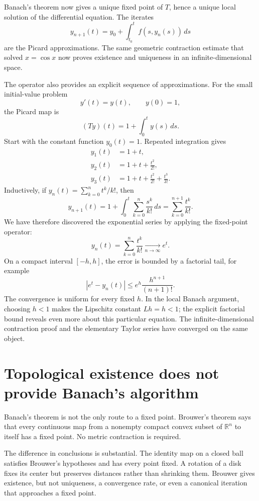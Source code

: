 Banach's theorem now gives a unique fixed point of \(T\), hence a unique local solution of the differential equation.  The iterates
\[
  y_{n+1}(t)
  =y_0+\int_{t_0}^{t}f(s,y_n(s))\,ds
\]
are the Picard approximations.  The same geometric contraction estimate that solved \(x=\cos x\) now proves existence and uniqueness in an infinite-dimensional space.

The operator also provides an explicit sequence of approximations. For the small initial-value problem
\[
 y'(t)=y(t),\qquad y(0)=1,
\]
the Picard map is
\[
 (Ty)(t)=1+\int_0^t y(s)\,ds.
\]
Start with the constant function $y_0(t)=1$. Repeated integration gives
\[
\begin{aligned}
 y_1(t)&=1+t,\\
 y_2(t)&=1+t+\frac{t^2}{2!},\\
 y_3(t)&=1+t+\frac{t^2}{2!}+\frac{t^3}{3!}.
\end{aligned}
\]
Inductively, if $y_n(t)=\sum_{k=0}^{n}t^k/k!$, then
\[
 y_{n+1}(t)
 =1+\int_0^t\sum_{k=0}^{n}\frac{s^k}{k!}\,ds
 =\sum_{k=0}^{n+1}\frac{t^k}{k!}.
\]
We have therefore discovered the exponential series by applying the fixed-point operator:
\[
 \boxed{y_n(t)=\sum_{k=0}^{n}\frac{t^k}{k!}
       \xrightarrow[n\to\infty]{}e^t.}
\]
On a compact interval $[-h,h]$, the error is bounded by a factorial tail, for example
\[
 |e^t-y_n(t)|
 \le e^h\frac{h^{n+1}}{(n+1)!}.
\]
The convergence is uniform for every fixed $h$. In the local Banach argument, choosing $h<1$ makes the Lipschitz constant $Lh=h<1$; the explicit factorial bound reveals even more about this particular equation. The infinite-dimensional contraction proof and the elementary Taylor series have converged on the same object.

\section{Topological existence does not provide Banach's algorithm}

Banach's theorem is not the only route to a fixed point.  Brouwer's theorem says that every continuous map from a nonempty compact convex subset of \(\mathbb R^n\) to itself has a fixed point.  No metric contraction is required.

The difference in conclusions is substantial.  The identity map on a closed ball satisfies Brouwer's hypotheses and has every point fixed.  A rotation of a disk fixes its center but preserves distances rather than shrinking them.  Brouwer gives existence, but not uniqueness, a convergence rate, or even a canonical iteration that approaches a fixed point.

